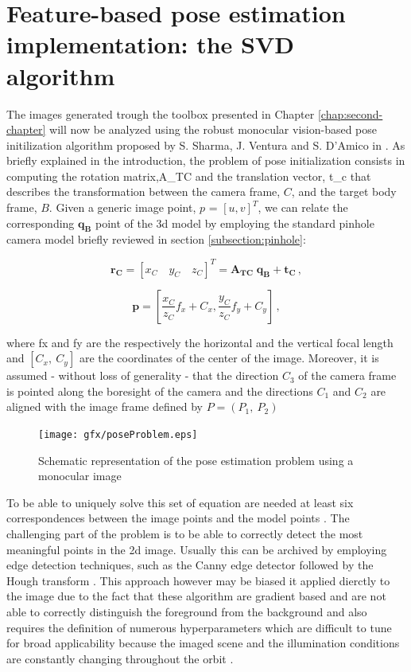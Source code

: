 \section{Feature-based pose estimation implementation: the SVD algorithm}
The images generated  trough the toolbox presented in Chapter \ref{chap:second-chapter} will now be analyzed using the robust monocular vision-based pose initilization algorithm proposed by S. Sharma, J. Ventura and S. D'Amico in \cite{Sharma2018}.
As briefly explained in the introduction, the problem of pose initialization consists in computing the rotation matrix,\gls{A_TC} and the translation vector, \gls{t_c} that describes the transformation between the camera frame, $C$, and the target body frame, $B$. Given a generic image point, $p$ = $ [u,v]^T $, we can relate the corresponding $\mathbf{q_B}$ point of the \acrshort{3d} model by employing the standard pinhole camera model briefly reviewed in section \ref{subsection:pinhole}:

\begin{equation}
  \mathbf{r_C} = \left[x_C \quad  y_C \quad z_C\right]^T = \mathbf{A_{TC}} \; \mathbf{q_B} + \mathbf{t_C} \,,
  \label{eq:rc}
\end{equation}

\begin{equation}
  \mathbf{p} = \left[ \frac{x_C}{z_C} f_x + C_x , \frac{y_C}{z_C} f_y + C_y \right] \,,
  \label{eq:p}
\end{equation}

where \gls{fx} and \gls{fy} are the respectively the horizontal and the vertical focal length and $ \left[C_x, \ C_y \right]$ are the coordinates of the center of the image. Moreover, it is assumed - without loss of generality - that the direction $\mathit{C_3}$ of the camera frame is pointed along the boresight of the camera and the directions $\mathit{C_1}$ and $\mathit{C_2}$ are aligned with the image frame defined by $P = \left( \mathit{P_1}, \ \mathit{P_2} \right)$

\begin{figure}[htbp]
  \centering
  \texttt{[image: gfx/poseProblem.eps]}
  \caption{Schematic representation of the pose estimation problem using a monocular image \cite{Sharma2018}}
  \label{fig:theposeproblem}
\end{figure}

To be able to uniquely solve this set of equation are needed at least six correspondences between the image points and the model points \cite{10.1145/358669.358692}. The challenging part of the problem is to be able to correctly detect the most meaningful points in the \acrshort{2d} image. Usually this can be archived by employing edge detection techniques, such as the Canny edge detector \cite{10.1109/TPAMI.1986.4767851} followed by the Hough transform \cite{10.1145/361237.361242}. This approach however may be biased it applied dierctly to the image due to the fact that these algorithm are gradient based and are not able to correctly distinguish the foreground from the background and also requires the definition of numerous hyperparameters which are difficult to tune for broad applicability because the imaged scene and the illumination conditions are constantly changing throughout the orbit \cite{Sharma2018}.

